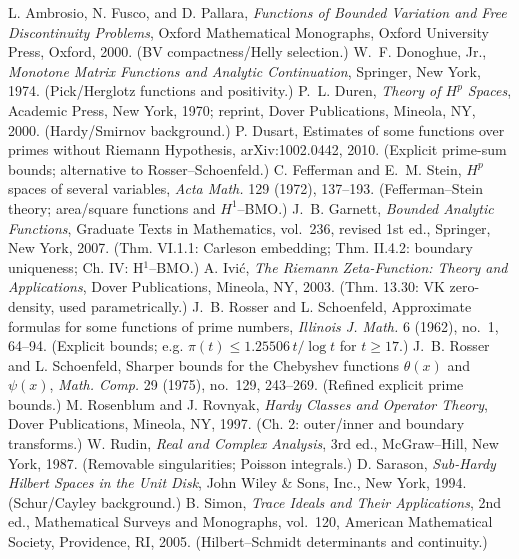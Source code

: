 \documentclass[11pt]{article}
\theoremstyle{definition}
\theoremstyle{remark}
\begin{document}
\begin{thebibliography}{99}
 L. Ambrosio, N. Fusco, and D. Pallara, \emph{Functions of Bounded Variation and Free Discontinuity Problems}, Oxford Mathematical Monographs, Oxford University Press, Oxford, 2000. (BV compactness/Helly selection.)
 W.~F. Donoghue, Jr., \emph{Monotone Matrix Functions and Analytic Continuation}, Springer, New York, 1974. (Pick/Herglotz functions and positivity.)
 P.~L. Duren, \emph{Theory of $H^p$ Spaces}, Academic Press, New York, 1970; reprint, Dover Publications, Mineola, NY, 2000. (Hardy/Smirnov background.)
 P. Dusart, Estimates of some functions over primes without Riemann Hypothesis, arXiv:1002.0442, 2010. (Explicit prime-sum bounds; alternative to Rosser--Schoenfeld.)
 C. Fefferman and E.~M. Stein, $H^p$ spaces of several variables, \emph{Acta Math.} 129 (1972), 137--193. (Fefferman--Stein theory; area/square functions and $H^1$--BMO.)
 J.~B. Garnett, \emph{Bounded Analytic Functions}, Graduate Texts in Mathematics, vol.~236, revised 1st ed., Springer, New York, 2007. (Thm. VI.1.1: Carleson embedding; Thm. II.4.2: boundary uniqueness; Ch. IV: H$^1$–BMO.)
 A. Ivi\'c, \emph{The Riemann Zeta-Function: Theory and Applications}, Dover Publications, Mineola, NY, 2003. (Thm. 13.30: VK zero-density, used parametrically.)
 J.~B. Rosser and L. Schoenfeld, Approximate formulas for some functions of prime numbers, \emph{Illinois J. Math.} 6 (1962), no.~1, 64--94. (Explicit bounds; e.g. $\pi(t)\le 1.25506\,t/\log t$ for $t\ge 17$.)
 J.~B. Rosser and L. Schoenfeld, Sharper bounds for the Chebyshev functions $\theta(x)$ and $\psi(x)$, \emph{Math. Comp.} 29 (1975), no.~129, 243--269. (Refined explicit prime bounds.)
 M. Rosenblum and J. Rovnyak, \emph{Hardy Classes and Operator Theory}, Dover Publications, Mineola, NY, 1997. (Ch. 2: outer/inner and boundary transforms.)
 W. Rudin, \emph{Real and Complex Analysis}, 3rd ed., McGraw--Hill, New York, 1987. (Removable singularities; Poisson integrals.)
 D. Sarason, \emph{Sub-Hardy Hilbert Spaces in the Unit Disk}, John Wiley \& Sons, Inc., New York, 1994. (Schur/Cayley background.)
 B. Simon, \emph{Trace Ideals and Their Applications}, 2nd ed., Mathematical Surveys and Monographs, vol.~120, American Mathematical Society, Providence, RI, 2005. (Hilbert--Schmidt determinants and continuity.)

\end{thebibliography}
\end{document}
